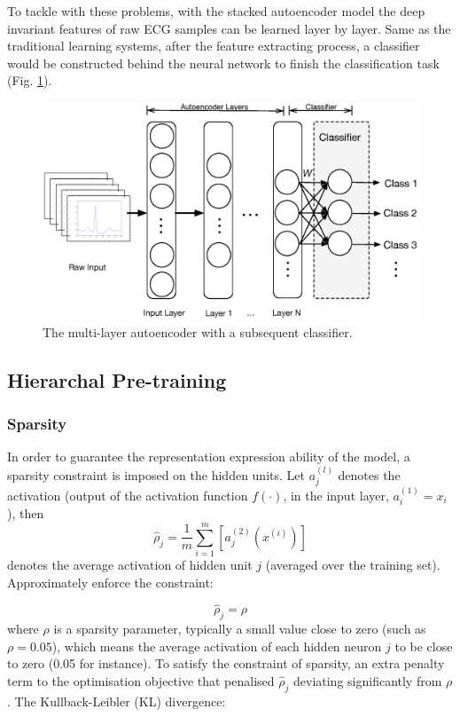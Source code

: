 \documentclass[journal]{IEEEtran}
\begin{document}
To tackle with these problems, with the stacked autoencoder model the deep invariant features of raw ECG samples can be learned layer by layer. Same as the traditional learning systems, after the feature extracting process, a classifier would be constructed behind the neural network to finish the classification task (Fig. \ref{figure3}). 

\begin{figure}[]
\centering
\includegraphics[width=3.5 in]{eps/figure3_classifier.eps}
\caption{The multi-layer autoencoder with a subsequent classifier.}
\label{figure3}
\end{figure}

\subsection{Hierarchal Pre-training}

\subsubsection{Sparsity}
In order to guarantee the representation expression ability of the model, a sparsity constraint is imposed on the hidden units. Let $a_{j}^{(l)}$ denotes the activation (output of the activation function $f(\cdot)$, in the input layer, $a_i^{(1)}=x_i$), then
\begin{equation}
\hat{\rho}_j = \frac{1}{m} \sum_{i=1}^m [{a_j^{(2)}}{(x^{(i)})}]
\end{equation}
denotes the average activation of hidden unit $j$ (averaged over the training set). Approximately enforce the constraint:

\begin{equation}
\hat{\rho}_j = \rho
\end{equation}
where $\rho$ is a sparsity parameter, typically a small value close to zero (such as $\rho = 0.05$), which means the average activation of each hidden neuron $j$ to be close to zero (0.05 for instance). 
To satisfy the constraint of sparsity, an extra penalty term to the optimisation objective that penalised $\hat{\rho}_j $ deviating significantly from $\rho$. The Kullback-Leibler (KL) divergence:
\end{document}

